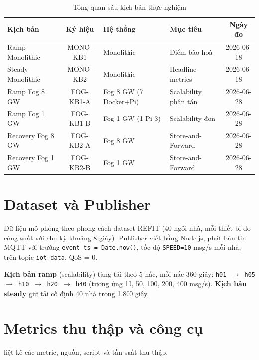 \documentclass[13pt,a4paper]{report}
\newcommand{\code}[1]{\texttt{\small #1}}
\begin{document}
\begin{table}[H]
\centering
\caption{Tổng quan sáu kịch bản thực nghiệm}
\label{tab:scenarios}
\small
\begin{tabular}{p{} c p{} p{} c}
\toprule
\textbf{Kịch bản} & \textbf{Ký hiệu} & \textbf{Hệ thống} & \textbf{Mục tiêu} & \textbf{Ngày đo} \\
\midrule
Ramp Monolithic   & MONO-KB1  & Monolithic            & Điểm bão hoà        & 2026-06-18 \\
Steady Monolithic & MONO-KB2  & Monolithic            & Headline metrics    & 2026-06-18 \\
Ramp Fog 8 GW     & FOG-KB1-A & Fog 8 GW (7 Docker+Pi)& Scalability phân tán& 2026-06-28 \\
Ramp Fog 1 GW     & FOG-KB1-B & Fog 1 GW (1 Pi 3)     & Scalability đơn     & 2026-06-28 \\
Recovery Fog 8 GW & FOG-KB2-A & Fog 8 GW              & Store-and-Forward   & 2026-06-28 \\
Recovery Fog 1 GW & FOG-KB2-B & Fog 1 GW              & Store-and-Forward   & 2026-06-28 \\
\bottomrule
\end{tabular}
\end{table}

\section{Dataset và Publisher}

Dữ liệu mô phỏng theo phong cách dataset REFIT (40 ngôi nhà, mỗi thiết bị đo công
suất với chu kỳ khoảng 8 giây). Publisher viết bằng Node.js, phát bản tin MQTT
với trường \code{event\_ts = Date.now()}, tốc độ \code{SPEED=10} msg/s mỗi nhà,
trên topic \code{iot-data}, QoS = 0.

\textbf{Kịch bản ramp} (scalability) tăng tải theo 5 nấc, mỗi nấc 360 giây:
\code{h01 $\to$ h05 $\to$ h10 $\to$ h20 $\to$ h40} (tương ứng 10, 50, 100, 200,
400 msg/s). \textbf{Kịch bản steady} giữ tải cố định 40 nhà trong 1.800 giây.

\section{Metrics thu thập và công cụ}

 liệt kê các metric, nguồn, script và tần suất thu thập.
\end{document}

